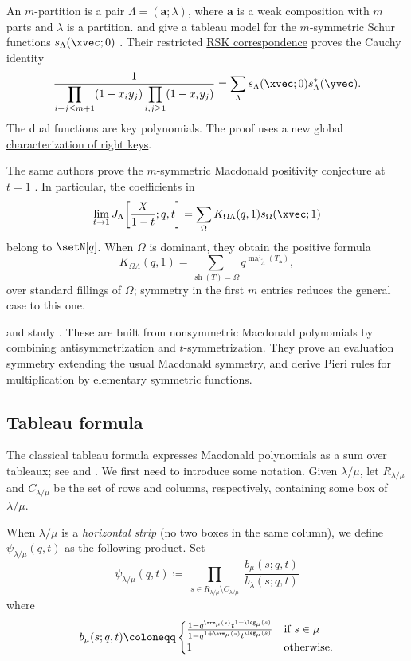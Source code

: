 An \(m\)-partition is a pair \(\Lambda=(\mathbf a;\lambda)\), where
\(\mathbf a\) is a weak composition with \(m\) parts and \(\lambda\) is a
partition.   and  give a tableau model for
the \(m\)-symmetric Schur functions \(s_\Lambda(\xvec;0)\)
\cite{LapointePena2026Keysx}.  Their restricted
\hyperref[rsk]{RSK correspondence} proves the Cauchy identity
\[
 \frac{1}{
   \displaystyle
   \prod_{i+j\leq m+1}(1-x_i y_j)
   \prod_{i,j\geq1}(1-x_i y_j)}
 =
 \sum_\Lambda
 s_\Lambda(\xvec;0)s_\Lambda^*(\yvec).
\]
The dual functions are key polynomials.  The proof uses a new global
\hyperref[keyRightKeyDecreasingWords]{characterization of right keys}.

The same authors prove the \(m\)-symmetric Macdonald positivity conjecture at
\(t=1\) \cite{LapointePena2026Macdonaldx}.  In particular, the coefficients in
\[
 \lim_{t\to1}
 J_\Lambda\!\left[\frac{X}{1-t};q,t\right]
 =
 \sum_\Omega K_{\Omega\Lambda}(q,1)s_\Omega(\xvec;1)
\]
belong to \(\setN[q]\).  When \(\Omega\) is dominant, they obtain the positive
formula
\[
 K_{\Omega\Lambda}(q,1)
 =
 \sum_{\operatorname{sh}(T)=\Omega}
 q^{\operatorname{maj}_{\widetilde{\Lambda}}(T_{\mathbf a})},
\]
over standard fillings of \(\Omega\); symmetry in the first \(m\) entries
reduces the general case to this one.

 and  study
\label{bisymmetricMacdonaldPolynomial}
\cite{ConchaLapointe2023x}.  These are built from nonsymmetric
Macdonald polynomials by combining antisymmetrization and $t$-symmetrization.
They prove an evaluation symmetry extending the usual Macdonald symmetry, and
derive Pieri rules for multiplication by elementary symmetric functions.



\subsection[macdonaldPTableauFormula]{Tableau formula}

The classical tableau formula expresses Macdonald polynomials as a sum over
tableaux; see \cite{Macdonald1987} and \cite{Macdonald1995}.
We first need to introduce some notation.
Given $\lambda/\mu$, let $R_{\lambda/\mu}$ and $C_{\lambda/\mu}$ be the set of
rows and columns, respectively, containing some box of $\lambda/\mu$.

When $\lambda/\mu$ is a \emph{horizontal strip} (no two boxes in the same column),
we define $\psi_{\lambda/\mu}(q,t)$ as the following product.
Set
\[
\psi_{\lambda/\mu}(q,t) \coloneqq
\prod_{\substack{ s \in R_{\lambda/\mu} \setminus C_{\lambda/\mu} }}
\frac{b_{\mu}(s;q,t)}{b_{\lambda}(s;q,t)}
\]
where
\[
b_{\mu}(s;q,t) \coloneqq
\begin{cases}
\frac{ 1-q^{\arm_\mu(s)}t^{1+\leg_\mu(s)}  }{ 1-q^{1+\arm_\mu(s)}t^{\leg_\mu(s)} }
&\text{if $s\in \mu$} \\
1 &\text{otherwise}.
\end{cases}
\]

